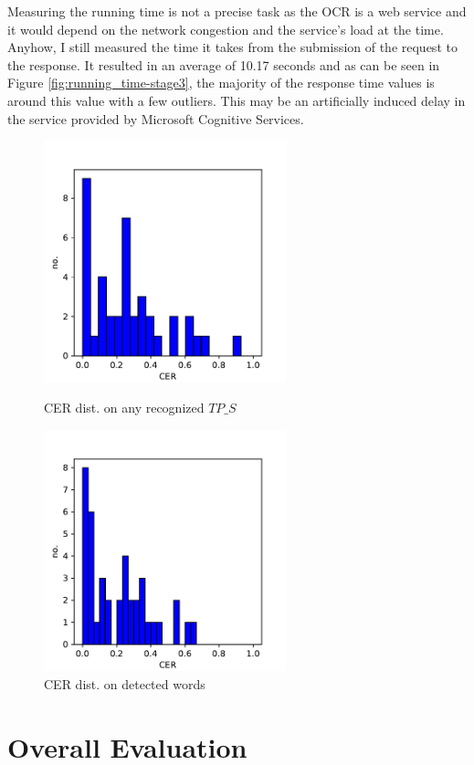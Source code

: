 Measuring the running time is not a precise task as the OCR is a web service and it would depend on the network congestion and the service's load at the time. Anyhow, I still measured the time it takes from the submission of the request to the response. It resulted in an average of 10.17 seconds and as can be seen in Figure \ref{fig:running_time-stage3}, the majority of the response time values is around this value with a few outliers. This may be an artificially induced delay in the service provided by Microsoft Cognitive Services.

\begin{figure}
    \centering
    \begin{minipage}[c]{0.5\linewidth}
        \centering
        \includegraphics[height=7cm, keepaspectratio]{img/evaluation/CER_on_recognized-stage3.pdf}
            \caption{CER dist. on any recognized $TP\_S$}
            \label{fig:CER_on_arecognized-stage3}
    \end{minipage}\hfill
    \begin{minipage}[c]{0.5\linewidth}
        \centering
        \includegraphics[height=7cm, keepaspectratio]{img/evaluation/CER_on_recognized_words-stage3.pdf}
            \caption{CER dist. on detected words}
            \label{fig:CER_on_recognized_words-stage3}
    \end{minipage}\hfill
\end{figure}

\section{Overall Evaluation}\label{section:evaluation-overall}

